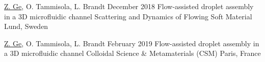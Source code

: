 \begin{conferences}
  \conferenceitem%
    {\underline{Z. Ge}, O. Tammisola, L. Brandt}%
    {December 2018}%
    {Flow-assisted droplet assembly in a 3D microfluidic channel}%
    {Scattering and Dynamics of Flowing Soft Material}%
    {Lund, Sweden}%

  \conferenceitem%
    {\underline{Z. Ge}, O. Tammisola, L. Brandt}%
    {February 2019}%
    {Flow-assisted droplet assembly in a 3D microfluidic channel}%
    {Colloidal Science \& Metamaterials (CSM)}%
    {Paris, France}%

\end{conferences}


%
\tableofcontents
